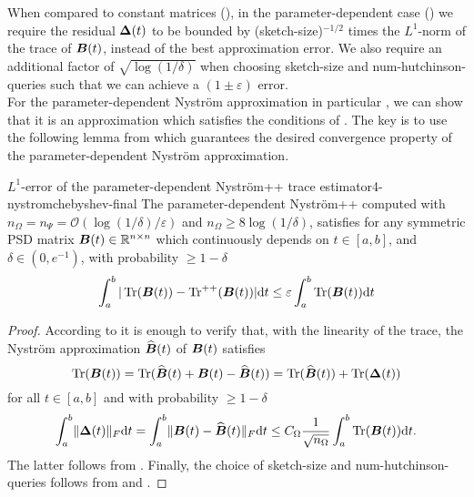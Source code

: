 When compared to constant matrices (),
in the parameter-dependent case ()
we require the residual $\boldsymbol{\Delta}(t)$ to be bounded by
(\gls{sketch-size})$^{-1/2}$ times the $L^1$-norm of the
trace of $\boldsymbol{B}(t)$, instead of the best approximation error.
We also require an additional factor of $\sqrt{\log(1/\delta)}$ when choosing
\gls{sketch-size} and \gls{num-hutchinson-queries} such that we can achieve
a $(1 \pm \varepsilon)$ error.\\

For the parameter-dependent Nystr\"om approximation in particular ,
we can show that it is an approximation which satisfies the conditions
of . The key is to use the following
lemma from \cite{he2023parameter} which guarantees the desired
convergence property of the parameter-dependent Nystr\"om approximation.

\begin{theorem}{$L^1$-error of the parameter-dependent Nystr\"om++ trace estimator}{4-nystromchebyshev-final}
    The parameter-dependent Nystr\"om++ computed with
    $n_{\Omega} = n_{\Psi} = \mathcal{O}\left( \log(1/\delta) / \varepsilon \right)$
    and $n_{\Omega} \geq 8 \log(1/\delta)$,
    satisfies for any symmetric \gls{PSD} matrix $\boldsymbol{B}(t) \in \mathbb{R}^{n \times n}$ which continuously
    depends on $t \in [a, b]$, and $\delta \in (0, e^{-1})$, with probability
    $\geq 1 - \delta$
    \begin{equation}
        \int_{a}^{b} |\operatorname{Tr}(\boldsymbol{B}(t)) - \operatorname{Tr}^{++}(\boldsymbol{B}(t))| \mathrm{d}t \leq \varepsilon \int_{a}^{b}\operatorname{Tr}(\boldsymbol{B}(t)) \mathrm{d}t
    \end{equation}
\end{theorem}

\begin{proof}
    According to 
    it is enough to verify that, with the linearity of the trace, the Nystr\"om
    approximation $\widehat{\boldsymbol{B}}(t)$ of $\boldsymbol{B}(t)$ satisfies 
    \begin{equation}
        \operatorname{Tr}(\boldsymbol{B}(t)) = \operatorname{Tr}(\widehat{\boldsymbol{B}}(t) + \boldsymbol{B}(t) - \widehat{\boldsymbol{B}}(t)) = \operatorname{Tr}(\widehat{\boldsymbol{B}}(t)) + \operatorname{Tr}(\boldsymbol{\Delta}(t))
    \end{equation}
    for all $t \in [a, b]$ and with probability $\geq 1 - \delta$
    \begin{equation}
        \int_{a}^{b} \lVert \boldsymbol{\Delta}(t) \rVert _F \mathrm{d}t = \int_{a}^{b} \lVert \boldsymbol{B}(t) - \widehat{\boldsymbol{B}}(t) \rVert _F \mathrm{d}t \leq C_{\Omega} \frac{1}{\sqrt{n_{\Omega}}} \int_{a}^{b} \operatorname{Tr}(\boldsymbol{B}(t)) \mathrm{d}t.
    \end{equation}
    The latter follows from . Finally,
    the choice of \gls{sketch-size} and \gls{num-hutchinson-queries} follows
    from 
    and .
\end{proof}

